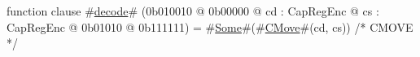 function clause #\hyperref[sailMIPSzdecode]{decode}# (0b010010 @ 0b00000 @ cd : CapRegEnc @ cs : CapRegEnc @    0b01010 @ 0b111111) = #\hyperref[sailMIPSzSome]{Some}#(#\hyperref[sailMIPSzCMove]{CMove}#(cd, cs)) /* CMOVE */
